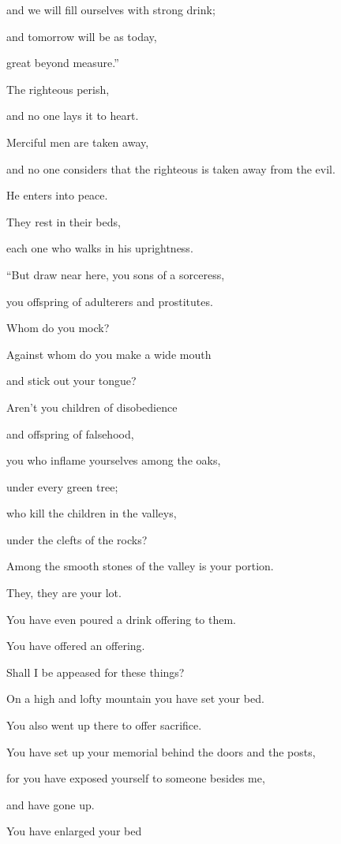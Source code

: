and we will fill ourselves with strong drink;

and tomorrow will be as today,

great beyond measure.”


\mychapter{} \myverse*{}The righteous perish,

\quad\quad and no one lays it to heart.

Merciful men are taken away,

and no one considers that the righteous is taken away from the evil.

\myverse{}He enters into peace.

They rest in their beds,

each one who walks in his uprightness.


\vspace{\baselineskip} \myverse{}“But draw near here, you sons of a sorceress,

you offspring of adulterers and prostitutes.

\myverse{}Whom do you mock?

Against whom do you make a wide mouth

and stick out your tongue?

Aren’t you children of disobedience

and offspring of falsehood,

\myverse{}you who inflame yourselves among the oaks,

under every green tree;

who kill the children in the valleys,

under the clefts of the rocks?

\myverse{}Among the smooth stones of the valley is your portion.

They, they are your lot.

You have even poured a drink offering to them.

You have offered an offering.

Shall I be appeased for these things?

\myverse{}On a high and lofty mountain you have set your bed.

You also went up there to offer sacrifice.

\myverse{}You have set up your memorial behind the doors and the posts,

for you have exposed yourself to someone besides me,

and have gone up.

You have enlarged your bed


